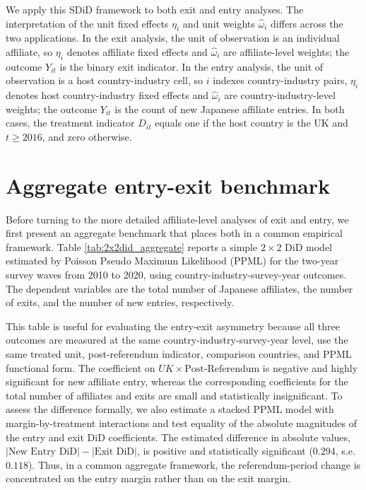 \documentclass[preprint,11pt,authoryear]{elsarticle}
\begin{document}
We apply this SDiD framework to both exit and entry analyses.
The interpretation of the unit fixed effects $\eta_{i}$ and unit weights $\hat{\omega}_{i}$ differs across the two applications.
In the exit analysis, the unit of observation is an individual affiliate, so $\eta_{i}$ denotes affiliate fixed effects and $\hat{\omega}_{i}$ are affiliate-level weights; the outcome $Y_{it}$ is the binary exit indicator.
In the entry analysis, the unit of observation is a host country-industry cell, so $i$ indexes country-industry pairs, $\eta_{i}$ denotes host country-industry fixed effects and $\hat{\omega}_{i}$ are country-industry-level weights; the outcome $Y_{it}$ is the count of new Japanese affiliate entries.
In both cases, the treatment indicator $D_{it}$ equals one if the host country is the UK and $t \geq 2016$, and zero otherwise.


\section{Aggregate entry-exit benchmark}\label{sec:aggregate_benchmark}

Before turning to the more detailed affiliate-level analyses of exit and entry, we first present an aggregate benchmark that places both in a common empirical framework. Table \ref{tab:2x2did_aggregate} reports a simple $2\times2$ DiD model estimated by Poisson Pseudo Maximum Likelihood (PPML) for the two-year survey waves from 2010 to 2020, using country-industry-survey-year outcomes. The dependent variables are the total number of Japanese affiliates, the number of exits, and the number of new entries, respectively.

This table is useful for evaluating the entry-exit asymmetry because all three outcomes are measured at the same country-industry-survey-year level, use the same treated unit, post-referendum indicator, comparison countries, and PPML functional form. The coefficient on $UK \times \text{Post-Referendum}$ is negative and highly significant for new affiliate entry, whereas the corresponding coefficients for the total number of affiliates and exits are small and statistically insignificant. To assess the difference formally, we also estimate a stacked PPML model with margin-by-treatment interactions and test equality of the absolute magnitudes of the entry and exit DiD coefficients. The estimated difference in absolute values, $\left|\textrm{New Entry DiD}\right|-\left|\textrm{Exit DiD}\right|$, is positive and statistically significant ($0.294$, s.e. $0.118$). Thus, in a common aggregate framework, the referendum-period change is concentrated on the entry margin rather than on the exit margin.
\end{document}

